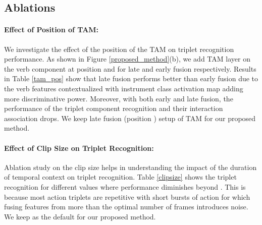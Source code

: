 \documentclass{article}
\begin{document}
\subsection{Ablations}
\paragraph{\textbf{Effect of Position of TAM:}} We investigate the effect of the position of the TAM on triplet recognition performance. As shown in Figure \ref{proposed_method}(b), we add  TAM layer on the verb component at position  and  for late and early fusion respectively. Results in Table \ref{tam_pos} show that late fusion performs better than early fusion due to the verb features contextualized with instrument class activation map adding more discriminative power. Moreover, with both early and late fusion, the performance of the triplet component recognition and their interaction association drops. We keep late fusion (position ) setup of TAM for our proposed method.





\begin{table}[ht]
\centering
    \setlength{\tabcolsep}{20pt}
\caption{\label{tam_pos}Triplet Recognition AP (\%) in early (EF) vs late (LF) fusion.}
\end{table}

\paragraph{\textbf{Effect of Clip Size  on Triplet Recognition:}} Ablation study on the clip size  helps in understanding the impact of the duration of temporal context on triplet recognition. Table \ref{clipsize} shows the triplet recognition for different  values where performance diminishes beyond . This is because most action triplets are repetitive with short bursts of action for which fusing features from more than the optimal number of frames introduces noise. We keep  as the default for our proposed method.
\end{document}
